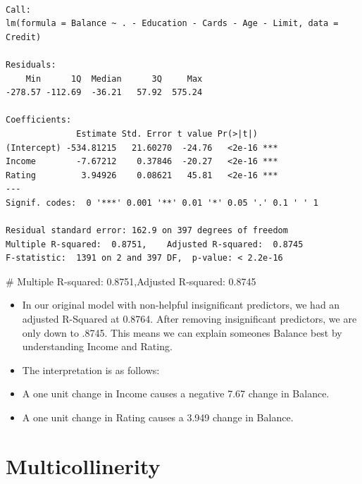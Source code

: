 \documentclass[
  letterpaper,
  DIV=11,
  numbers=noendperiod]{scrreprt}
\newenvironment{Shaded}{\begin{snugshade}}{\end{snugshade}}
\newcommand{\CommentTok}[1]{\textcolor[rgb]{0.37,0.37,0.37}{#1}}
\providecommand{\tightlist}{%
  \setlength{\itemsep}{0pt}\setlength{\parskip}{0pt}}\usepackage{longtable,booktabs,array}
\begin{document}
\begin{verbatim}

Call:
lm(formula = Balance ~ . - Education - Cards - Age - Limit, data = Credit)

Residuals:
    Min      1Q  Median      3Q     Max 
-278.57 -112.69  -36.21   57.92  575.24 

Coefficients:
              Estimate Std. Error t value Pr(>|t|)    
(Intercept) -534.81215   21.60270  -24.76   <2e-16 ***
Income        -7.67212    0.37846  -20.27   <2e-16 ***
Rating         3.94926    0.08621   45.81   <2e-16 ***
---
Signif. codes:  0 '***' 0.001 '**' 0.01 '*' 0.05 '.' 0.1 ' ' 1

Residual standard error: 162.9 on 397 degrees of freedom
Multiple R-squared:  0.8751,    Adjusted R-squared:  0.8745 
F-statistic:  1391 on 2 and 397 DF,  p-value: < 2.2e-16
\end{verbatim}

\begin{Shaded}
\begin{Highlighting}[]
\CommentTok{\# Multiple R{-}squared: 0.8751,Adjusted R{-}squared: 0.8745}
\end{Highlighting}
\end{Shaded}

\begin{itemize}
\tightlist
\item
  In our original model with non-helpful insignificant predictors, we
  had an adjusted R-Squared at 0.8764. After removing insignificant
  predictors, we are only down to .8745. This means we can explain
  someones Balance best by understanding Income and Rating.
\item
  The interpretation is as follows:
\item
  A one unit change in Income causes a negative 7.67 change in Balance.
\item
  A one unit change in Rating causes a 3.949 change in Balance.
\end{itemize}

\section{Multicollinerity}\label{multicollinerity}
\end{document}
